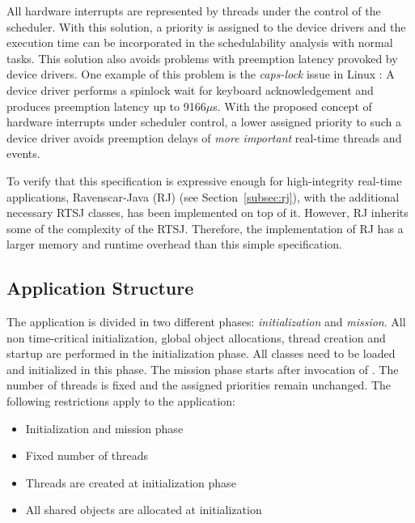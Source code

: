 All hardware interrupts are represented by threads under the control
of the scheduler. With this solution, a priority is assigned to the
device drivers and the execution time can be incorporated in the
schedulability analysis with normal tasks. This solution also avoids
problems with preemption latency provoked by device drivers. One
example of this problem is the \emph{caps-lock} issue in Linux
\cite{REDLinux2003}: A device driver performs a spinlock wait for
keyboard acknowledgement and produces preemption latency up to
9166$\mu$s. With the proposed concept of hardware interrupts under
scheduler control, a lower assigned priority to such a device driver
avoids preemption delays of \emph{more important} real-time threads
and events.


To verify that this specification is expressive enough for
high-integrity real-time applications, Ravenscar-Java (RJ)
\cite{583825} (see Section~\ref{subsec:rj}), with the additional
necessary RTSJ classes, has been implemented on top of it. However,
RJ inherits some of the complexity of the RTSJ. Therefore, the
implementation of RJ has a larger memory and runtime overhead than
this simple specification.

\subsection{Application Structure}

The application is divided in two different phases:
\emph{initialization} and \emph{mission}. All non time-critical
initialization, global object allocations, thread creation and
startup are performed in the initialization phase. All classes need
to be loaded and initialized in this phase. The mission phase starts
after invocation of . The number of threads is
fixed and the assigned priorities remain unchanged. The following
restrictions apply to the application:

\begin{itemize}
\item Initialization and mission phase
\item Fixed number of threads
\item Threads are created at initialization phase
\item All shared objects are allocated at initialization
\end{itemize}

